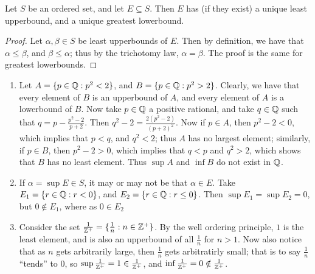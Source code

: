 \begin{lemma}\label{1.1.1}
    Let $S$ be an ordered set, and let $E \subseteq S$. Then  $E$ has (if they exist) a
    unique least upperbound, and a unique greatest lowerbound.
\end{lemma}
\begin{proof}
    Let $\alpha, \beta \in S$ be least upperbounds of $E$. Then by definition, we have that
    $\alpha \leq \beta$, and  $\beta \leq \alpha$; thus by the trichotomy law,  $\alpha=\beta$. The proof is the same
    for greatest lowerbounds.
\end{proof}

\begin{example}
    \begin{enumerate}[label=(\arabic*)]
        \item Let $A=\{p \in \mathbb{Q}: p^2<2\}$, and $B=\{p \in \mathbb{Q}: p^2>2\}$. Clearly, we
            have that every element of $B$ is an upperbound of $A$, and every element of
             $A$ is a lowerbound of  $B$. Now take  $p \in \mathbb{Q}$ a positive rational, and
             take  $q \in \mathbb{Q}$ such that $q=p-\frac{p^2-2}{p+2}$. Then $q^2-2=\frac{2(p^2-2)}{(p+2)^2}$.
             Now if $p \in A$, then  $p^2-2<0$, which implies that  $p<q$, and $q^2<2$; thus
             $A$ has no largest element; similarly, if  $p \in B$, then  $p^2-2>0$, which
             implies that  $q<p$ and  $q^2>2$, which shows that  $B$ has no least element. Thus
             $\sup{A}$ and  $\inf{B}$ do not exist in $\mathbb{Q}$.

         \item If  $\alpha = \sup{E} \in S$, it may or may not be that  $\alpha \in E$. Take
             $E_1=\{r \in \mathbb{Q}: r<0\}$, and  $E_2=\{r \in \mathbb{Q}: r \leq 0\}$. Then $\sup{E_1}=
             \sup{E_2}=0$, but $0 \notin E_1$, where as $0 \in E_2$

         \item Consider the set $ \frac{1}{\mathbb{Z}^+}=\{\frac{1}{n}: n \in \mathbb{Z}^+\}$. By the
             well ordering principle, $1$ is the least element, and is also an upperbound
             of all  $ \frac{1}{n}$ for $n>1$. Now also notice that as $n$ gets arbitrarily
             large, then  $ \frac{1}{n}$ gets arbitratirly small; that is to say $\frac{1}{n}$
             ``tends'' to $0$, so  $\sup{\frac{1}{\mathbb{Z}^+}}=1 \in \frac{1}{\mathbb{Z}^+}$, and
             $\inf{\frac{1}{\mathbb{Z}^+}}=0 \notin \frac{1}{\mathbb{Z}^+}$.
    \end{enumerate}
\end{example}

